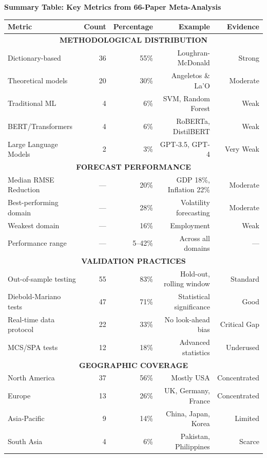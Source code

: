 \documentclass[11pt]{article}
\begin{document}
\noindent\textbf{Summary Table: Key Metrics from 66-Paper Meta-Analysis}

\begin{table}[H]
\centering \small
\begin{tabular}{|l|r|r|r|r|}
\hline
\textbf{Metric} & \textbf{Count} & \textbf{Percentage} & \textbf{Example} & \textbf{Evidence} \\
\hline
\multicolumn{5}{|c|}{\textbf{METHODOLOGICAL DISTRIBUTION}} \\
\hline
Dictionary-based & 36 & 55\% & Loughran-McDonald & Strong \\
Theoretical models & 20 & 30\% & Angeletos \& La'O & Moderate \\
Traditional ML & 4 & 6\% & SVM, Random Forest & Weak \\
BERT/Transformers & 4 & 6\% & RoBERTa, DistilBERT & Weak \\
Large Language Models & 2 & 3\% & GPT-3.5, GPT-4 & Very Weak \\
\hline
\multicolumn{5}{|c|}{\textbf{FORECAST PERFORMANCE}} \\
\hline
Median RMSE Reduction & — & 20\% & GDP 18\%, Inflation 22\% & Moderate \\
Best-performing domain & — & 28\% & Volatility forecasting & Moderate \\
Weakest domain & — & 16\% & Employment & Weak \\
Performance range & — & 5--42\% & Across all domains & — \\
\hline
\multicolumn{5}{|c|}{\textbf{VALIDATION PRACTICES}} \\
\hline
Out-of-sample testing & 55 & 83\% & Hold-out, rolling window & Standard \\
Diebold-Mariano tests & 47 & 71\% & Statistical significance & Good \\
Real-time data protocol & 22 & 33\% & No look-ahead bias & Critical Gap \\
MCS/SPA tests & 12 & 18\% & Advanced statistics & Underused \\
\hline
\multicolumn{5}{|c|}{\textbf{GEOGRAPHIC COVERAGE}} \\
\hline
North America & 37 & 56\% & Mostly USA & Concentrated \\
Europe & 13 & 26\% & UK, Germany, France & Concentrated \\
Asia-Pacific & 9 & 14\% & China, Japan, Korea & Limited \\
South Asia & 4 & 6\% & Pakistan, Philippines & Scarce \\

\end{tabular}
\end{table}
\end{document}
